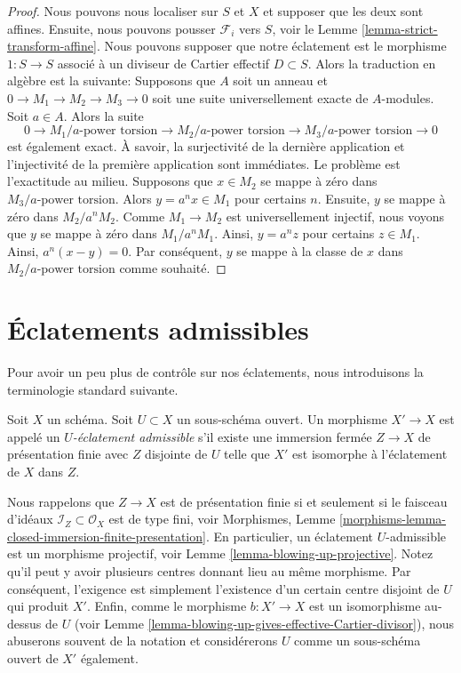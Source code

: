 \begin{proof}
Nous pouvons nous localiser sur  $S$  et  $X$  et supposer que les
deux sont affines. Ensuite, nous pouvons pousser  $\mathcal{F}_i$  vers  $S$,
voir le Lemme  \ref{lemma-strict-transform-affine}. Nous pouvons supposer que notre éclatement est le
morphisme  $1 : S \to S$  associé à un diviseur de Cartier effectif  $D \subset S$.
Alors la traduction en algèbre est la suivante: Supposons que  $A$  soit un
anneau et  $0 \to M_1 \to M_2 \to M_3 \to 0$  soit une suite universellement exacte de
 $A$-modules. Soit  $a\in A$. Alors la suite
$$
0 \to
M_1/a\text{-power torsion} \to
M_2/a\text{-power torsion} \to
M_3/a\text{-power torsion} \to 0
$$
est également exact. À savoir, la surjectivité de la dernière application et
l'injectivité de la première application sont immédiates. Le problème est
l'exactitude au milieu. Supposons que  $x \in M_2$  se mappe à zéro dans
 $M_3/a\text{-power torsion}$. Alors  $y = a^n x \in M_1$  pour certains  $n$. Ensuite,  $y$ 
se mappe à zéro dans  $M_2/a^nM_2$. Comme  $M_1 \to M_2$  est universellement
injectif, nous voyons que  $y$  se mappe à zéro dans  $M_1/a^nM_1$. Ainsi,
 $y = a^n z$  pour certains  $z \in M_1$. Ainsi,  $a^n(x - y) = 0$. Par conséquent,
 $y$  se mappe à la classe de  $x$  dans  $M_2/a\text{-power torsion}$  comme
souhaité.
\end{proof}







\section{Éclatements admissibles}
\label{section-admissible-blowups}

\noindent
Pour avoir un peu plus de contrôle sur nos éclatements, nous introduisons la
terminologie standard suivante.

\begin{definition}
\label{definition-admissible-blowup}
Soit  $X$  un schéma. Soit  $U \subset X$  un sous-schéma ouvert. Un morphisme
 $X' \to X$  est appelé un  {\it   $U$-éclatement
admissible}  s'il existe une immersion fermée  $Z \to X$  de
présentation finie avec  $Z$  disjointe de  $U$  telle que
 $X'$  est isomorphe à l'éclatement de  $X$  dans  $Z$.
\end{definition}

\noindent
Nous rappelons que  $Z \to X$  est de présentation finie si et seulement si le
faisceau d'idéaux  $\mathcal{I}_Z \subset \mathcal{O}_X$  est de type fini, voir Morphismes, Lemme
 \ref{morphisms-lemma-closed-immersion-finite-presentation}. En particulier, un éclatement  $U$-admissible est un
morphisme projectif, voir Lemme  \ref{lemma-blowing-up-projective}. Notez qu'il peut y avoir plusieurs
centres donnant lieu au même morphisme. Par conséquent, l'exigence est simplement
l'existence d'un certain centre disjoint de  $U$  qui produit  $X'$.
Enfin, comme le morphisme  $b : X' \to X$  est un isomorphisme au-dessus de
 $U$  (voir Lemme  \ref{lemma-blowing-up-gives-effective-Cartier-divisor}), nous abuserons souvent de la notation et
considérerons  $U$  comme un sous-schéma ouvert de  $X'$  également.

